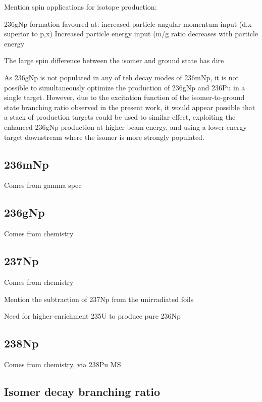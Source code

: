 Mention spin applications for isotope production:

236gNp formation favoured at:
increased particle angular momentum input (d,x superior to p,x) 
Increased particle energy input (m/g ratio decreases with particle energy


The large spin difference between the isomer and ground state has dire



As 236gNp is not populated in any of teh decay modes of 236mNp, it is not possible to simultaneously optimize the production of 236gNp and 236Pu in a single target.
However, due to the  excitation function of the isomer-to-ground state branching ratio  observed in the present work, it would appear possible that a stack of production targets could be used to similar effect, exploiting the enhanced 236gNp production at higher beam energy, and using a lower-energy target downstream where the isomer is more strongly populated. 



\subsection{236mNp}

Comes from gamma spec




\subsection{236gNp}

Comes from chemistry 



\subsection{237Np}

Comes from chemistry

Mention the subtraction of 237Np from the unirradiated foils

Need for higher-enrichment 235U to produce pure 236Np



\subsection{238Np}

Comes from chemistry, via 238Pu MS



\subsection{Isomer decay branching ratio}

